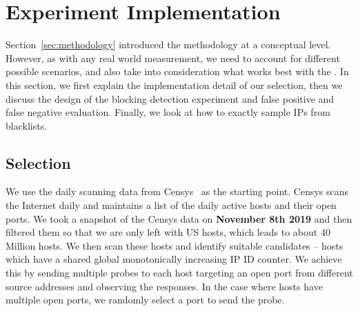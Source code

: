 \section{Experiment Implementation}
\label{sec:implementation}

Section~\ref{sec:methodology} introduced the methodology at a conceptual level.
However, as with any real world measurement, we need to account for different
possible scenarios, and also take into consideration what works best with the
{}. In this section, we first explain the implementation detail of
our {} selection, then we discuss the design of the blocking detection
experiment and false positive and false negative evaluation. Finally, we look
at how to exactly sample IPs from blacklists.


\subsection{{} Selection}

We use the daily scanning data from Censys~\cite{censys} as the starting point.
Censys scans the Internet daily and maintains a list of the daily active hosts
and their open ports. We took a snapshot of the Censys data on
\textbf{November 8th 2019} and then filtered them so that we are only left
with US hosts, which leads to about 40 Million hosts. We then scan these hosts
and identify suitable candidates -- hosts which have a shared global
monotonically increasing IP ID counter. We achieve this by sending multiple
probes to each host targeting an open port from different source addresses
and observing the responses. In the case where hosts have multiple open
ports, we randomly select a port to send the probe.

